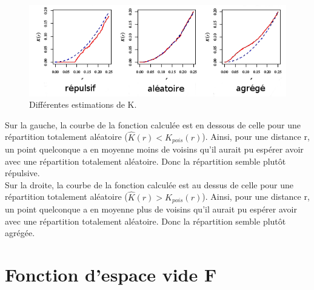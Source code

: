 \documentclass[stage2a]{tnreport}
\begin{document}
\begin{figure}[h]
  \centering
  \includegraphics[scale=0.7]{figures/interpretK2.png}
  \caption{Différentes estimations de K.}
  \label{fig:interpretK}
\end{figure}


Sur la gauche, la courbe de la fonction calculée est en dessous de celle pour une répartition totalement aléatoire (\begin{math}\hat{K}(r) < K_{pois}(r) \end{math}). Ainsi, pour une distance r, un point quelconque a en moyenne moins de voisins qu'il aurait pu espérer avoir avec une répartition totalement aléatoire. Donc la répartition semble plutôt répulsive.\\
\indent
Sur la droite, la courbe de la fonction calculée est au dessus de celle pour une répartition totalement aléatoire (\begin{math}\hat{K}(r) > K_{pois}(r) \end{math}). Ainsi, pour une distance r, un point quelconque a en moyenne plus de voisins qu'il aurait pu espérer avoir avec une répartition totalement aléatoire. Donc la répartition semble plutôt agrégée.\\




\section{Fonction d'espace vide F}
\end{document}
